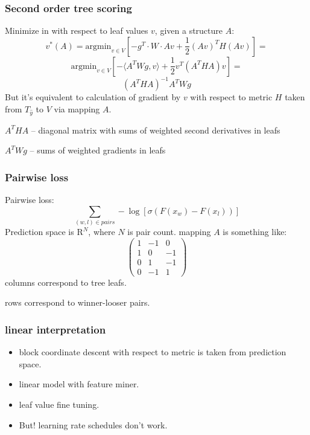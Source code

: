 \documentclass{beamer}
\begin{document}
\begin{frame}
\frametitle{Second order tree scoring}

Minimize in with respect to leaf values $v$, given a structure $A$:
$$ v^*(A) = \mathrm{argmin}_{v \in V} \left[- g^T \cdot W \cdot  Av + \frac12 (Av)^TH(Av) \right] = $$
$$ \mathrm{argmin}_{v \in V} \left[- \langle A^TWg, v \rangle + \frac12 v^T(A^THA)v \right] = $$
$$ (A^THA)^{-1} A^TWg $$
But it's equivalent to calculation of gradient by $v$ with respect to metric $H$ taken from $T_{\hat y}$ to $V$ via mapping $A$. \par
\vspace{0.5cm}
$A^T H A$ -- diagonal matrix with sums of weighted second derivatives in leafs \par
$A^T W g$ -- sums of weighted gradients in leafs \par

\end{frame}

\begin{frame}
\frametitle{Pairwise loss}

Pairwise loss:
$$ \sum_{(w, l) \in pairs} -\log \left[\sigma(F(x_w) - F(x_l)) \right] $$
Prediction space is $\mathrm{R}^N$, where $N$ is pair count.
mapping $A$ is something like:
$$
\begin{pmatrix}
1 & -1 & 0 \\
1 & 0 & -1 \\
0 & 1 & -1 \\
0 & -1 & 1
\end{pmatrix}
$$
columns correspond to tree leafs. \par
rows correspond to winner-looser pairs.

\end{frame}



\begin{frame}
\frametitle{linear interpretation}
\begin{itemize}
	\item block coordinate descent with respect to metric is taken from prediction space.
	\item linear model with feature miner.
	\item leaf value fine tuning.
	\item But! learning rate schedules don't work.
\end{itemize}
\end{frame}
\end{document}
